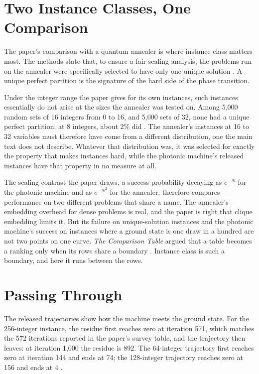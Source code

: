 \documentclass[11pt]{article}
\theoremstyle{definition}
\theoremstyle{remark}
\begin{document}
\section{Two Instance Classes, One Comparison}

The paper's comparison with a quantum annealer is where instance class matters most. The methods state that, to ensure a fair scaling analysis, the problems run on the annealer were specifically selected to have only one unique solution \cite{alkayed2025}. A unique perfect partition is the signature of the hard side of the phase transition.

Under the integer range the paper gives for its own instances, such instances essentially do not arise at the sizes the annealer was tested on. Among 5,000 random sets of 16 integers from 0 to 16, and 5,000 sets of 32, none had a unique perfect partition; at 8 integers, about 2\% did \cite{flyxion-script2}. The annealer's instances at 16 to 32 variables must therefore have come from a different distribution, one the main text does not describe. Whatever that distribution was, it was selected for exactly the property that makes instances hard, while the photonic machine's released instances have that property in no measure at all.

The scaling contrast the paper draws, a success probability decaying as $e^{-N}$ for the photonic machine and as $e^{-N^2}$ for the annealer, therefore compares performance on two different problems that share a name. The annealer's embedding overhead for dense problems is real, and the paper is right that clique embedding limits it. But its failure on unique-solution instances and the photonic machine's success on instances where a ground state is one draw in a hundred are not two points on one curve. \emph{The Comparison Table} argued that a table becomes a ranking only when its rows share a boundary \cite{flyxion-table}. Instance class is such a boundary, and here it runs between the rows.

\section{Passing Through}

The released trajectories show how the machine meets the ground state. For the 256-integer instance, the residue first reaches zero at iteration 571, which matches the 572 iterations reported in the paper's survey table, and the trajectory then leaves: at iteration 1,000 the residue is 892. The 64-integer trajectory first reaches zero at iteration 144 and ends at 74; the 128-integer trajectory reaches zero at 156 and ends at 4 \cite{cmimrepo}.
\end{document}
